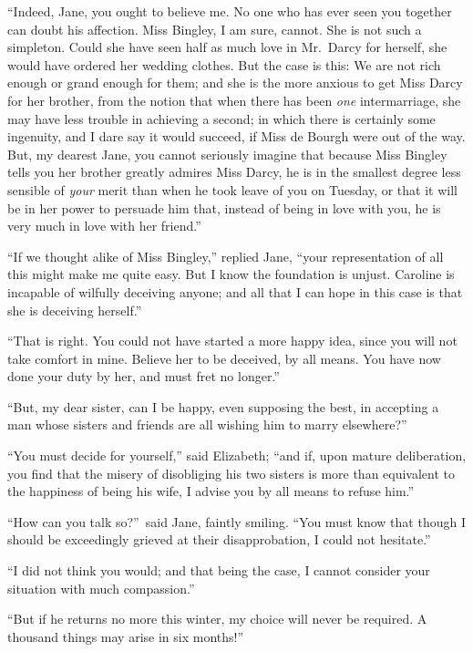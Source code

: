 \documentclass[12pt,english,oneside]{book}
\begin{document}
{}``Indeed, Jane, you ought to believe me. No one who has ever seen
you together can doubt his affection. Miss Bingley, I am sure, cannot.
She is not such a simpleton. Could she have seen half as much love
in Mr.\ Darcy for herself, she would have ordered her wedding clothes.
But the case is this: We are not rich enough or grand enough for them;
and she is the more anxious to get Miss Darcy for her brother, from
the notion that when there has been \textit{one} intermarriage, she
may have less trouble in achieving a second; in which there is certainly
some ingenuity, and I dare say it would succeed, if Miss de Bourgh
were out of the way. But, my dearest Jane, you cannot seriously imagine
that because Miss Bingley tells you her brother greatly admires Miss
Darcy, he is in the smallest degree less sensible of \textit{your}
merit than when he took leave of you on Tuesday, or that it will be
in her power to persuade him that, instead of being in love with you,
he is very much in love with her friend.''

{}``If we thought alike of Miss Bingley,'' replied Jane, {}``your
representation of all this might make me quite easy. But I know the
foundation is unjust. Caroline is incapable of wilfully deceiving
anyone; and all that I can hope in this case is that she is deceiving
herself.''

{}``That is right. You could not have started a more happy idea,
since you will not take comfort in mine. Believe her to be deceived,
by all means. You have now done your duty by her, and must fret no
longer.''

{}``But, my dear sister, can I be happy, even supposing the best,
in accepting a man whose sisters and friends are all wishing him to
marry elsewhere?''\ 

{}``You must decide for yourself,'' said Elizabeth; {}``and if,
upon mature deliberation, you find that the misery of disobliging
his two sisters is more than equivalent to the happiness of being
his wife, I advise you by all means to refuse him.''

{}``How can you talk so?''\ said Jane, faintly smiling. {}``You
must know that though I should be exceedingly grieved at their disapprobation,
I could not hesitate.''

{}``I did not think you would; and that being the case, I cannot
consider your situation with much compassion.''

{}``But if he returns no more this winter, my choice will never be
required. A thousand things may arise in six months!''\ 
\end{document}

